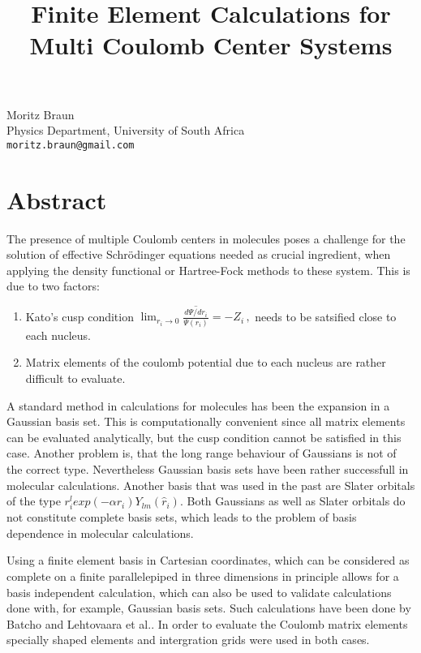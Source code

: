 \title{Finite Element Calculations for Multi Coulomb Center Systems}
\author{} \institute{}
\maketitle

\begin{center}
{\large Moritz Braun}\\
Physics Department, University of South Africa\\
{\tt moritz.braun@gmail.com}
\end{center}

\section*{Abstract}
The presence of multiple Coulomb centers in molecules poses a challenge for the solution of effective Schr\"odinger equations needed as crucial ingredient, when applying the density functional or Hartree-Fock methods to these system. This is due to two factors:
\begin{enumerate}
\item Kato's cusp condition\cite{Kato}
$
\lim_{r_i\to 0}
\overline
{\frac{d\Psi/dr_i}{\Psi(r_i)}}=-Z_i\,,
$
needs to be satsified close to each nucleus. 
\item Matrix elements of the coulomb potential due to each nucleus are rather  difficult to evaluate.
\end{enumerate}
A standard method in calculations for molecules has been the expansion in a Gaussian basis set. This is computationally convenient since all  matrix elements can be evaluated analytically, but the cusp condition cannot be satisfied in this case. Another problem is, that the long range behaviour of Gaussians is not of the correct type. Nevertheless Gaussian basis sets have been rather successfull  in molecular calculations.  Another basis that was used in the past  are Slater orbitals of the type $r_i^lexp(-\alpha r_i) Y_{lm}({\hat r_i})$. Both Gaussians as well as Slater orbitals do not constitute complete basis sets, which leads to the problem of basis dependence in molecular calculations.

Using a finite element basis in Cartesian coordinates, which can be considered as complete on a finite parallelepiped in three dimensions in principle allows for a basis independent calculation, which can also be used to validate calculations done with, for example, Gaussian basis sets. Such calculations have been done by Batcho\cite{Batcho} and  Lehtovaara et al.\cite{Lehto}. In order to evaluate the Coulomb matrix elements specially shaped elements and intergration grids were used in both cases.

